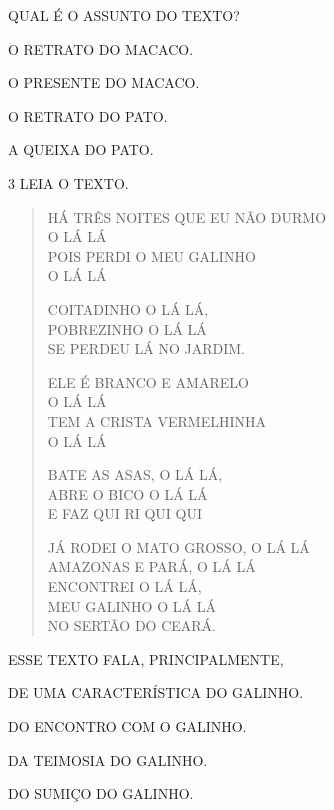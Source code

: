 QUAL É O ASSUNTO DO TEXTO?

\begin{escolha}
\item O RETRATO DO MACACO.

\item O PRESENTE DO MACACO.

\item O RETRATO DO PATO.

\item A QUEIXA DO PATO.
\end{escolha}

\num{3} LEIA O TEXTO.

\begin{myquote}
\begin{verse}
HÁ TRÊS NOITES QUE EU NÃO DURMO\\
O LÁ LÁ\\
POIS PERDI O MEU GALINHO\\
O LÁ LÁ


COITADINHO O LÁ LÁ,\\
POBREZINHO O LÁ LÁ\\
SE PERDEU LÁ NO JARDIM.


ELE É BRANCO E AMARELO\\
O LÁ LÁ\\
TEM A CRISTA VERMELHINHA\\
O LÁ LÁ


BATE AS ASAS, O LÁ LÁ,\\
ABRE O BICO O LÁ LÁ\\
E FAZ QUI RI QUI QUI


JÁ RODEI O MATO GROSSO, O LÁ LÁ\\
AMAZONAS E PARÁ, O LÁ LÁ\\
ENCONTREI O LÁ LÁ,\\
MEU GALINHO O LÁ LÁ\\
NO SERTÃO DO CEARÁ.
\end{verse}

\end{myquote}

ESSE TEXTO FALA, PRINCIPALMENTE,

\begin{escolha}
\item DE UMA CARACTERÍSTICA DO GALINHO.

\item DO ENCONTRO COM O GALINHO.

\item DA TEIMOSIA DO GALINHO.

\item DO SUMIÇO DO GALINHO.
\end{escolha}





